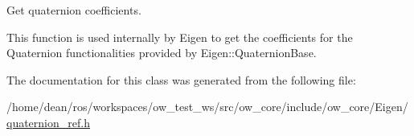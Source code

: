 Get quaternion coefficients. 

This function is used internally by Eigen to get the coefficients for the Quaternion functionalities provided by Eigen\+::\+Quaternion\+Base. 

The documentation for this class was generated from the following file\+:\begin{DoxyCompactItemize}
\item 
/home/dean/ros/workspaces/ow\+\_\+test\+\_\+ws/src/ow\+\_\+core/include/ow\+\_\+core/\+Eigen/\hyperlink{Eigen_2quaternion__ref_8h}{quaternion\+\_\+ref.\+h}\end{DoxyCompactItemize}
